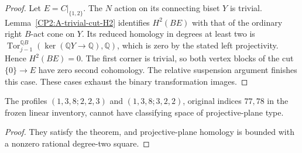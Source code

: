 \begin{proof}
Let $E=C|_{\{1,2\}}$.  The $N$ action on its connecting
biset $Y$ is trivial.  Lemma~\ref{CP2:A-trivial-cut-H2}
identifies $H^2(BE)$ with that of the ordinary right
$B$-act cone on $Y$.  Its reduced homology in degrees
at least two is
$\operatorname{Tor}_{j-1}^{\mathbb QB}
(\ker(\mathbb QY\to\mathbb Q),\mathbb Q)$, which is
zero by the stated left projectivity.  Hence $H^2(BE)=0$.
The first corner is trivial, so both vertex blocks of
the cut $\{0\}\to E$ have zero second cohomology.
The relative suspension argument finishes this case.
These cases exhaust the binary transformation images.
\end{proof}

\begin{corollary}
\label{CP2:A-linear19-two-short-binary-large-profiles}
The profiles $(1,3,8;2,2,3)$ and $(1,3,8;3,2,2)$,
original indices $77,78$ in the frozen linear inventory,
cannot have classifying space of projective-plane type.
\end{corollary}
\begin{proof}
They satisfy the theorem, and projective-plane homology
is bounded with a nonzero rational degree-two square.
\end{proof}

